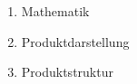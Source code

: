 \begin{enumerate}
\item{Mathematik}
\item{Produktdarstellung}
\item{Produktstruktur} 
\end{enumerate} 